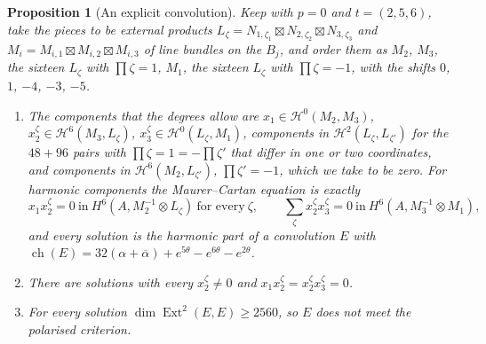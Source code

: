 \documentclass[11pt,reqno]{amsart}
\theoremstyle{plain}
\newtheorem{proposition}[theorem]{Proposition}
\theoremstyle{definition}
\theoremstyle{remark}
\newcommand{\cH}{\mathcal{H}}
\DeclareMathOperator{\ch}{ch}
\DeclareMathOperator{\Ext}{Ext}
\newcommand{\bbar}[1]{\overline{#1}}
\begin{document}
\begin{proposition}[An explicit convolution]\label{prop:explicitconvolution}
Keep  with $p=0$ and $t=(2,5,6)$, take the pieces to
be external products $L_{\zeta}=N_{1,\zeta_{1}}\boxtimes N_{2,\zeta_{2}}
\boxtimes N_{3,\zeta_{3}}$ and $M_{i}=M_{i,1}\boxtimes M_{i,2}\boxtimes
M_{i,3}$ of line bundles on the $B_{j}$, and order them as $M_{2}$, $M_{3}$,
the sixteen $L_{\zeta}$ with $\prod\zeta=1$, $M_{1}$, the sixteen $L_{\zeta}$
with $\prod\zeta=-1$, with the shifts $0$, $1$, $-4$, $-3$, $-5$.
\begin{enumerate}[label=\textup{(\roman*)},leftmargin=2.6em,itemsep=2pt]
\item The components that the degrees allow are
  $x_{1}\in\cH^{0}(M_{2},M_{3})$, $x_{2}^{\zeta}\in\cH^{6}(M_{3},L_{\zeta})$,
  $x_{3}^{\zeta}\in\cH^{0}(L_{\zeta},M_{1})$, components in
  $\cH^{2}(L_{\zeta},L_{\zeta'})$ for the $48+96$ pairs with
  $\prod\zeta=1=-\prod\zeta'$ that differ in one or two coordinates, and
  components in $\cH^{6}(M_{2},L_{\zeta'})$, $\prod\zeta'=-1$, which we take
  to be zero. For harmonic components the Maurer--Cartan equation is exactly
  \[
    x_{1}x_{2}^{\zeta}=0\ \text{in}\ H^{6}(A,M_{2}^{-1}\otimes L_{\zeta})
    \ \text{for every}\ \zeta,
    \qquad
    \sum_{\zeta}x_{2}^{\zeta}x_{3}^{\zeta}=0\ \text{in}\
    H^{6}(A,M_{3}^{-1}\otimes M_{1}),
  \]
  and every solution is the harmonic part of a convolution $E$ with
  $\ch(E)=32(\alpha+\bbar\alpha)+e^{5\theta}-e^{6\theta}-e^{2\theta}$.
\item There are solutions with every $x_{2}^{\zeta}\ne0$ and
  $x_{1}x_{2}^{\zeta}=x_{2}^{\zeta}x_{3}^{\zeta}=0$.
\item For every solution $\dim\Ext^{2}(E,E)\ge2560$, so $E$ does not meet
  the polarised criterion.
\end{enumerate}
\end{proposition}
\end{document}
